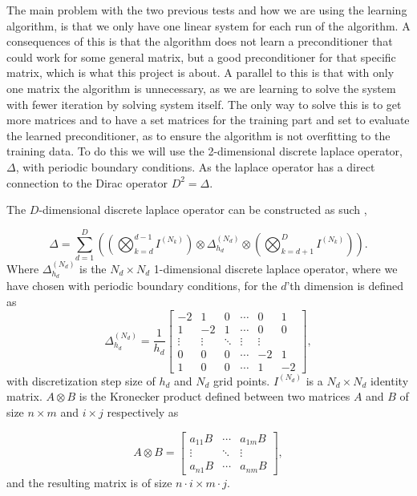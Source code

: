 The main problem with the two previous tests and how we are using the learning algorithm, is that we only have one linear system for each run of the algorithm. A consequences of this is that the algorithm does not learn a preconditioner that could work for some general matrix, but a good preconditioner for that specific matrix, which is what this project is about. A parallel to this is that with only one matrix the algorithm is unnecessary, as we are learning to solve the system with fewer iteration by solving system itself. The only way to solve this is to get more matrices and to have a set matrices for the training part and set to evaluate the learned preconditioner, as to ensure the algorithm is not overfitting to the training data. To do this we will use the 2-dimensional discrete laplace operator, \(\Delta\), with periodic boundary conditions. As the laplace operator has a direct connection to the Dirac operator \(D^2=\Delta\). 

\noindent The \(D\)-dimensional discrete laplace operator can be constructed as such \cite{boutot2026},

\begin{equation}
    \Delta =\sum_{d=1}^{D}\left(\left(\bigotimes_{k=d}^{d-1} I^{(N_k)} \right)\otimes \Delta_{h_d}^{(N_d)} \otimes \left(\bigotimes_{k=d+1}^{D}I^{(N_k)}\right)\right).
\end{equation}
Where \(\Delta_{h_d}^{(N_d)}\) is the \(N_d\times N_d\) 1-dimensional discrete laplace operator, where we have chosen with periodic boundary conditions, for the \(d\)'th dimension is defined as
\begin{equation}
    \Delta_{h_d}^{(N_d)}=\frac{1}{h_d}
    \begin{bmatrix}
    -2 &1 & 0 &\cdots & 0 & 1\\
    1 & -2 &1 & \cdots & 0 & 0\\
    \vdots&\vdots & \ddots & \vdots & \vdots\\
    0 & 0 &0 & \cdots & -2 & 1\\
    1 & 0 &0 & \cdots & 1 & -2
    \end{bmatrix},
\end{equation}
with discretization step size of \(h_d\) and \(N_d\) grid points. \(I^{(N_d)}\) is a \(N_d\times N_d\) identity matrix. \(A\otimes B\) is the Kronecker product defined between two matrices \(A\) and \(B\) of size \(n\times m\) and \(i\times j\) respectively as

\begin{equation*}
    A\otimes B =
    \begin{bmatrix}
    a_{11} B & \cdots & a_{1m}B\\
    \vdots  & \ddots & \vdots\\
    a_{n1}B & \cdots & a_{nm}B
    \end{bmatrix},
\end{equation*}
and the resulting matrix is of size \(n\cdot i \times m\cdot j\).

